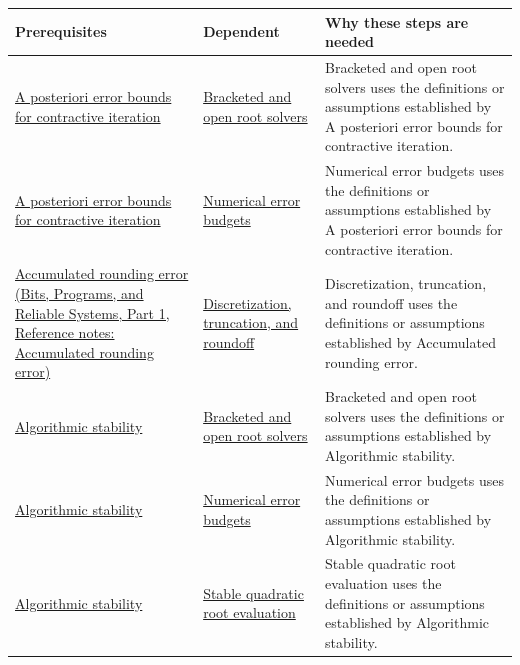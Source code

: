 {\def\LTcaptype{none} %
\begin{longtable}[]{@{}
  >{\raggedright\arraybackslash}p{}
  >{\raggedright\arraybackslash}p{}
  >{\raggedright\arraybackslash}p{}@{}}
\toprule\noalign{}
\begin{minipage}[b]{\linewidth}\raggedright
Prerequisites
\end{minipage} & \begin{minipage}[b]{\linewidth}\raggedright
Dependent
\end{minipage} & \begin{minipage}[b]{\linewidth}\raggedright
Why these steps are needed
\end{minipage} \\
\midrule\noalign{}
\endhead
\bottomrule\noalign{}
\endlastfoot
\hyperref[appendix-d83b0ad1be7f]{A posteriori error bounds for contractive iteration} & \hyperref[appendix-f63eb850796d]{Bracketed and open root solvers} & Bracketed and open root solvers uses the definitions or assumptions established by A posteriori error bounds for contractive iteration. \\
\hyperref[appendix-d83b0ad1be7f]{A posteriori error bounds for contractive iteration} & \hyperref[appendix-31b8c295e05f]{Numerical error budgets} & Numerical error budgets uses the definitions or assumptions established by A posteriori error bounds for contractive iteration. \\
\href{../01-Bits-Programs-and-Reliable-Systems-P01/main.pdf\#nameddest=appendix-f82e270791c8}{Accumulated rounding error (Bits, Programs, and Reliable Systems, Part 1, Reference notes: Accumulated rounding error)} & \hyperref[appendix-6b0648b2b8e8]{Discretization, truncation, and roundoff} & Discretization, truncation, and roundoff uses the definitions or assumptions established by Accumulated rounding error. \\
\hyperref[appendix-aa2bf0d79639]{Algorithmic stability} & \hyperref[appendix-f63eb850796d]{Bracketed and open root solvers} & Bracketed and open root solvers uses the definitions or assumptions established by Algorithmic stability. \\
\hyperref[appendix-aa2bf0d79639]{Algorithmic stability} & \hyperref[appendix-31b8c295e05f]{Numerical error budgets} & Numerical error budgets uses the definitions or assumptions established by Algorithmic stability. \\
\hyperref[appendix-aa2bf0d79639]{Algorithmic stability} & \hyperref[appendix-b9afba7f63e5]{Stable quadratic root evaluation} & Stable quadratic root evaluation uses the definitions or assumptions established by Algorithmic stability. \\

\end{longtable}}
